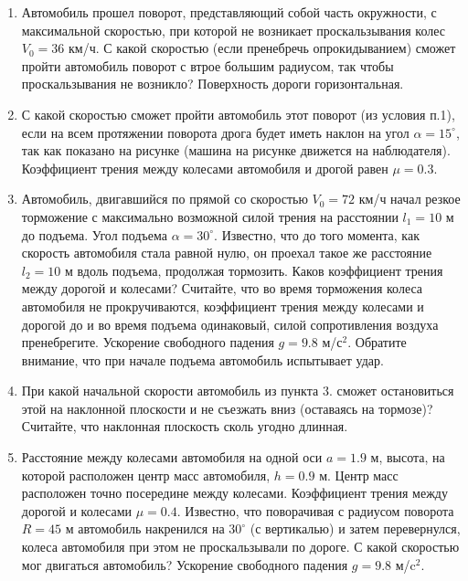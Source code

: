 
\begin{enumerate}
    \item Автомобиль прошел поворот, представляющий собой часть окружности, с максимальной скоростью, при которой не возникает проскальзывания колес $V_0 = 36$ км/ч. С какой скоростью (если пренебречь опрокидыванием) сможет пройти автомобиль поворот с втрое большим радиусом, так чтобы проскальзывания не возникло? Поверхность дороги горизонтальная.


    \item С какой скоростью сможет пройти автомобиль этот поворот (из условия п.1), если на всем протяжении поворота дрога будет иметь наклон на угол $\alpha = 15^{\circ}$, так как показано на рисунке (машина на рисунке движется на наблюдателя).  Коэффициент трения между колесами автомобиля и дрогой равен $\mu =0.3$.
    \item Автомобиль, двигавшийся по прямой со скоростью $V_0 = 72$ км/ч начал резкое торможение с максимально возможной силой трения на расстоянии $l_1 = 10$ м до подъема. Угол подъема $\alpha=30^{\circ}$. Известно, что до того момента, как скорость автомобиля стала равной нулю, он проехал такое же расстояние $l_2 = 10$ м вдоль подъема, продолжая тормозить. Каков коэффициент трения между дорогой и колесами? Считайте, что во время торможения колеса автомобиля не прокручиваются, коэффициент трения между колесами и дорогой до и во время подъема одинаковый, силой сопротивления воздуха пренебрегите. Ускорение свободного падения $g = 9.8$ м/с$^2$. Обратите внимание, что при начале подъема автомобиль испытывает удар.
    \item При какой начальной скорости автомобиль из пункта 3. сможет остановиться этой на наклонной плоскости и не съезжать вниз (оставаясь на тормозе)? Считайте, что наклонная плоскость сколь угодно длинная.
    \item Расстояние между колесами автомобиля на одной оси $a = 1.9$ м, высота, на которой расположен центр масс автомобиля, $h = 0.9$ м. Центр масс расположен точно посередине между колесами. Коэффициент трения между дорогой и колесами $\mu = 0.4$. Известно, что поворачивая с радиусом поворота $R = 45$ м автомобиль накренился на $30^{\circ}$ (с вертикалью) и затем перевернулся, колеса автомобиля при этом не проскальзывали по дороге. С какой скоростью мог двигаться автомобиль? Ускорение свободного падения $g = 9.8$ м/c$^2$.
\end{enumerate}